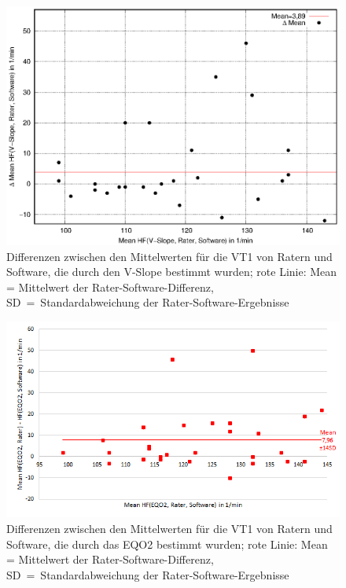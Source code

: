 %
\begin{figure}[H]
	\centering
	\includegraphics[scale=1]{Bilder/vslope.eps}
	\caption[Differenzen der V-Slope-Ergebnisse zwischen Ratern und Software]{Differenzen zwischen den Mittelwerten für die VT1 von Ratern und Software, die durch den V-Slope bestimmt wurden; rote Linie: Mean = Mittelwert der Rater-Software-Differenz, SD~=~Standardabweichung der Rater-Software-Ergebnisse}
	\label{pic:pic23}
\end{figure}
%
\begin{figure}[H]
	\centering
	\includegraphics[scale=0.7]{Bilder/mean_eqo2}
	\caption[Differenzen der \gls{EQO2}-Ergebnisse zwischen Ratern und Software]{Differenzen zwischen den Mittelwerten für die VT1 von Ratern und Software, die durch das \gls{EQO2} bestimmt wurden; rote Linie: Mean = Mittelwert der Rater-Software-Differenz, SD~=~Standardabweichung der Rater-Software-Ergebnisse}
	\label{pic:pic24}
\end{figure}
